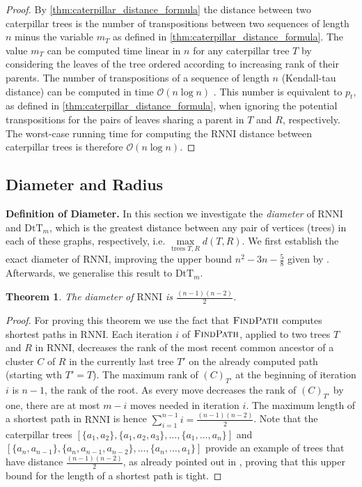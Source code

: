 \documentclass[11pt]{amsart}
\newtheorem{theorem}{Theorem}
\newcommand{\rnni}{\mathrm{RNNI}}
\newcommand{\findpath}{\textsc{FindPath}}
\newcommand{\dtt}{\mathrm{DtT}}
\renewcommand{\O}{\mathcal O}
\newcommand{\summary}[1]{\textbf{#1}} %
\begin{document}
\begin{proof}
	By \autoref{thm:caterpillar_distance_formula} the distance between two caterpillar trees is the number of transpositions between two sequences of length $n$ minus the variable $m_T$ as defined in \autoref{thm:caterpillar_distance_formula}.
	The value $m_T$ can be computed time linear in $n$ for any caterpillar tree $T$ by considering the leaves of the tree ordered according to increasing rank of their parents.
	The number of transpositions of a sequence of length $n$ (Kendall-tau distance) can be computed in time $\O(n \log n)$ \autocite{Knight1966-hx}.
	This number is equivalent to $p_t$, as defined in \autoref{thm:caterpillar_distance_formula}, when ignoring the potential transpositions for the pairs of leaves sharing a parent in $T$ and $R$, respectively.
	The worst-case running time for computing the $\rnni$ distance between caterpillar trees is therefore $\O(n \log n)$.
\end{proof}

\subsection{Diameter and Radius}

\summary{Definition of Diameter.}
In this section we  investigate the \emph{diameter} of $\rnni$ and $\dtt_m$, which is the greatest distance between any pair of vertices (trees) in each of these graphs, respectively, i.e. $\max\limits_{\text{trees }T,R}d(T,R)$.
We first establish the exact diameter of $\rnni$, improving the upper bound $n^2 - 3n - \frac{5}{8}$ given by \textcite{Gavryushkin2018-ol}.
Afterwards, we generalise this result to $\dtt_m$.

\begin{theorem}
	The diameter of $\rnni$ is $\frac{(n-1)(n-2)}{2}$.
	\label{thm:diameter_rnni}
\end{theorem}

\begin{proof}
	For proving this theorem we use the fact that $\findpath$ computes shortest paths in $\rnni$.
	Each iteration $i$ of $\findpath$, applied to two trees $T$ and $R$ in $\rnni$, decreases the rank of the most recent common ancestor of a cluster $C$ of $R$ in the currently last tree $T'$ on the already computed path (starting wth $T' = T$).
	The maximum rank of $(C)_{T'}$ at the beginning of iteration $i$ is $n-1$, the rank of the root.
	As every move decreases the rank of $(C)_{T'}$ by one, there are at most $m-i$ moves needed in iteration $i$.
	The maximum length of a shortest path in $\rnni$ is hence $\sum \limits_{i = 1}^{n-1} i = \frac{(n-1)(n-2)}{2}$.
	Note that the caterpillar trees $[\{a_1, a_2\}, \{a_1, a_2, a_3\}, \ldots, \{a_1, \ldots, a_n\}]$ and $[\{a_n, a_{n-1}\}, \{a_n, a_{n-1}, a_{n-2}\}, \ldots, \{a_n, \ldots, a_1\}]$ provide an example of trees that have distance $\frac{(n-1)(n-2)}{2}$, as already pointed out in \autocite[Corollary 1]{Collienne2020-iu}, proving that this upper bound for the length of a shortest path is tight.
\end{proof}
\end{document}
